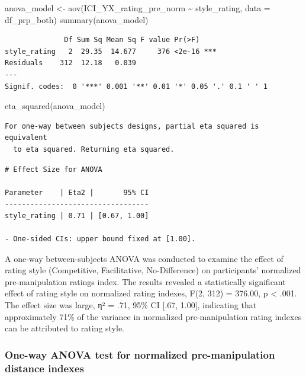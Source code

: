 \documentclass[
  letterpaper,
  DIV=11,
  numbers=noendperiod]{scrartcl}
\newenvironment{Shaded}{\begin{snugshade}}{\end{snugshade}}
\newcommand{\AttributeTok}[1]{\textcolor[rgb]{0.40,0.45,0.13}{#1}}
\newcommand{\FunctionTok}[1]{\textcolor[rgb]{0.28,0.35,0.67}{#1}}
\newcommand{\NormalTok}[1]{\textcolor[rgb]{0.00,0.23,0.31}{#1}}
\newcommand{\OtherTok}[1]{\textcolor[rgb]{0.00,0.23,0.31}{#1}}
\newcommand{\SpecialCharTok}[1]{\textcolor[rgb]{0.37,0.37,0.37}{#1}}
\begin{document}
\begin{Shaded}
\begin{Highlighting}[]
\NormalTok{anova\_model }\OtherTok{\textless{}{-}} \FunctionTok{aov}\NormalTok{(ICI\_YX\_rating\_pre\_norm }\SpecialCharTok{\textasciitilde{}}\NormalTok{ style\_rating, }\AttributeTok{data =}\NormalTok{ df\_prp\_both)}
\FunctionTok{summary}\NormalTok{(anova\_model)}
\end{Highlighting}
\end{Shaded}

\begin{verbatim}
              Df Sum Sq Mean Sq F value Pr(>F)    
style_rating   2  29.35  14.677     376 <2e-16 ***
Residuals    312  12.18   0.039                   
---
Signif. codes:  0 '***' 0.001 '**' 0.01 '*' 0.05 '.' 0.1 ' ' 1
\end{verbatim}

\begin{Shaded}
\begin{Highlighting}[]
\FunctionTok{eta\_squared}\NormalTok{(anova\_model)}
\end{Highlighting}
\end{Shaded}

\begin{verbatim}
For one-way between subjects designs, partial eta squared is equivalent
  to eta squared. Returning eta squared.
\end{verbatim}

\begin{verbatim}
# Effect Size for ANOVA

Parameter    | Eta2 |       95% CI
----------------------------------
style_rating | 0.71 | [0.67, 1.00]

- One-sided CIs: upper bound fixed at [1.00].
\end{verbatim}

A one-way between-subjects ANOVA was conducted to examine the effect of
rating style (Competitive, Facilitative, No-Difference) on participants'
normalized pre-manipulation ratings index. The results revealed a
statistically significant effect of rating style on normalized rating
indexes, F(2, 312) = 376.00, p \textless{} .001. The effect size was
large, η² = .71, 95\% CI {[}.67, 1.00{]}, indicating that approximately
71\% of the variance in normalized pre-manipulation rating indexes can
be attributed to rating style.

\subsubsection{One-way ANOVA test for normalized pre-manipulation
distance
indexes}\label{one-way-anova-test-for-normalized-pre-manipulation-distance-indexes}
\end{document}
